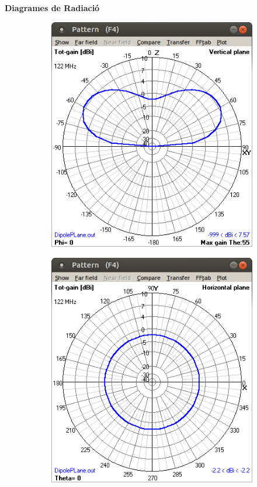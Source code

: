  \textbf{Diagrames de Radiació}

 	\begin{figure}[H]
	\centering
	  \begin{subfigure}[b]{0.32\textwidth}
	  \includegraphics[width=\textwidth]{./images/2.Dypole_overPlane/2_vertical.png}
	  \caption{}
	  \label{2diag1}
	  \end{subfigure}
	  \qquad %
	  \begin{subfigure}[b]{0.32\textwidth}
	  \includegraphics[width=\textwidth]{./images/2.Dypole_overPlane/2_horizontal.png}

\end{subfigure}
\end{figure}
